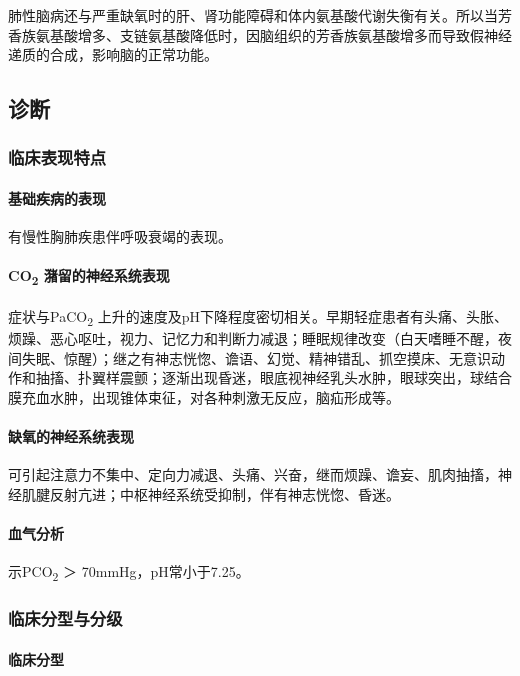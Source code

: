 肺性脑病还与严重缺氧时的肝、肾功能障碍和体内氨基酸代谢失衡有关。所以当芳香族氨基酸增多、支链氨基酸降低时，因脑组织的芳香族氨基酸增多而导致假神经递质的合成，影响脑的正常功能。

\subsection{诊断}

\subsubsection{临床表现特点}

\paragraph{基础疾病的表现}

有慢性胸肺疾患伴呼吸衰竭的表现。

\paragraph{CO\textsubscript{2} 潴留的神经系统表现}

症状与PaCO\textsubscript{2}
上升的速度及pH下降程度密切相关。早期轻症患者有头痛、头胀、烦躁、恶心呕吐，视力、记忆力和判断力减退；睡眠规律改变（白天嗜睡不醒，夜间失眠、惊醒）；继之有神志恍惚、谵语、幻觉、精神错乱、抓空摸床、无意识动作和抽搐、扑翼样震颤；逐渐出现昏迷，眼底视神经乳头水肿，眼球突出，球结合膜充血水肿，出现锥体束征，对各种刺激无反应，脑疝形成等。

\paragraph{缺氧的神经系统表现}

可引起注意力不集中、定向力减退、头痛、兴奋，继而烦躁、谵妄、肌肉抽搐，神经肌腱反射亢进；中枢神经系统受抑制，伴有神志恍惚、昏迷。

\paragraph{血气分析}

示PCO\textsubscript{2} ＞ 70mmHg，pH常小于7.25。

\subsubsection{临床分型与分级}

\paragraph{临床分型}

